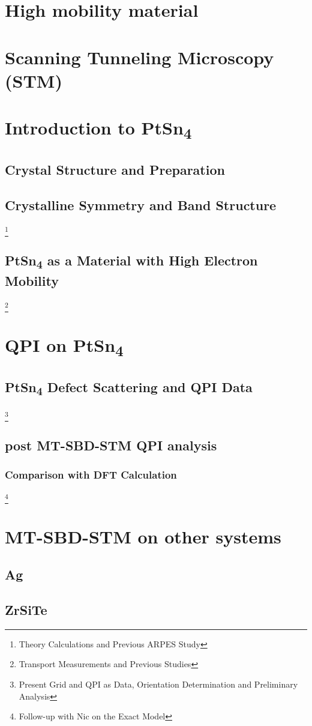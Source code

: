 \chapter{High mobility material}

\chapter{Scanning Tunneling Microscopy (STM)}
	

\chapter{Introduction to PtSn\textsubscript{4}}
	\section{Crystal Structure and Preparation}
	\section{Crystalline Symmetry and Band Structure} 
\footnote{Theory Calculations and Previous ARPES Study}
	\section{PtSn\textsubscript{4} as a Material with High Electron Mobility}
	\footnote{Transport Measurements and Previous Studies}









\chapter{QPI on PtSn\textsubscript{4}}
\section{PtSn\textsubscript{4} Defect Scattering and QPI Data}
\footnote{Present Grid and QPI as Data, Orientation Determination and Preliminary Analysis}
\section{post MT-SBD-STM QPI analysis}
\subsection{Comparison with DFT Calculation}
\footnote{Follow-up with Nic on the Exact Model}

\chapter{MT-SBD-STM on other systems}
\section{Ag}
\section{ZrSiTe}